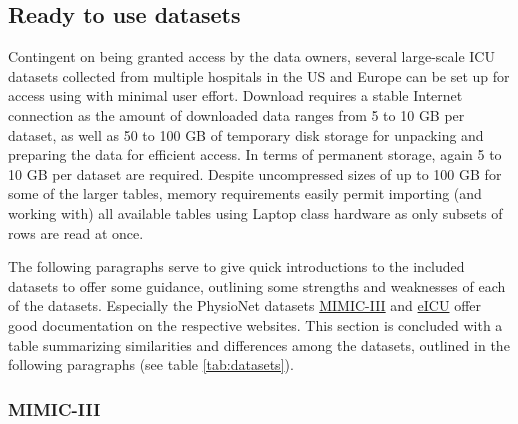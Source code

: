 \documentclass[
  notitle]{jss}
\begin{document}
\hypertarget{ready-to-use-datasets}{%
\subsection{Ready to use datasets}\label{ready-to-use-datasets}}

Contingent on being granted access by the data owners, several
large-scale ICU datasets collected from multiple hospitals in the US and
Europe can be set up for access using  with minimal user
effort. Download requires a stable Internet connection as the amount of
downloaded data ranges from 5 to 10 GB per dataset, as well as 50 to 100
GB of temporary disk storage for unpacking and preparing the data for
efficient access. In terms of permanent storage, again 5 to 10 GB per
dataset are required. Despite uncompressed sizes of up to 100 GB for
some of the larger tables, memory requirements easily permit importing
(and working with) all available tables using Laptop class hardware as
only subsets of rows are read at once.

The following paragraphs serve to give quick introductions to the
included datasets to offer some guidance, outlining some strengths and
weaknesses of each of the datasets. Especially the PhysioNet datasets
\href{https://mimic.physionet.org/about/mimic/}{MIMIC-III} and
\href{https://eicu-crd.mit.edu/about/eicu/}{eICU} offer good
documentation on the respective websites. This section is concluded with
a table summarizing similarities and differences among the datasets,
outlined in the following paragraphs (see table \ref{tab:datasets}).

\hypertarget{mimic-iii}{%
\subsubsection{MIMIC-III}\label{mimic-iii}}
\end{document}
